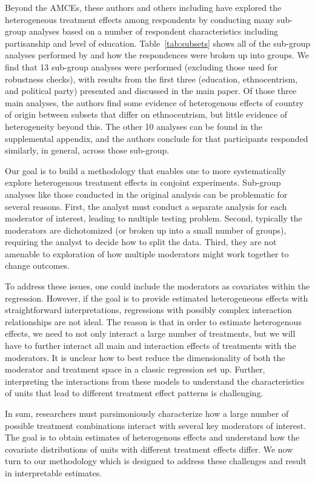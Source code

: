 Beyond the AMCEs, these authors and others including
\citet{newman2019economic} have explored the heterogeneous treatment
effects among respondents by conducting many sub-group analyses based
on a number of respondent characteristics including partisanship and
level of education.  Table~\ref{tab:subsets} shows all of the
sub-group analyses performed by \cite{hainmueller2015hidden} and how
the respondences were broken up into groups.  We find that 13
sub-group analyses were performed (excluding those used for robustness
checks), with results from the first three (education, ethnocentrism,
and political party) presented and discussed in the main paper.  Of
those three main analyses, the authors find some evidence of
heterogenous effects of country of origin between subsets that differ
on ethnocentrism, but little evidence of heterogeneity beyond this.
The other 10 analyses can be found in the supplemental appendix, and
the authors conclude for that participants responded similarly, in
general, across those sub-group.

Our goal is to build a methodology that enables one to more
systematically explore heterogenous treatment effects in conjoint
experiments.  Sub-group analyses like those conducted in the original
analysis can be problematic for several reasons.  First, the analyst
must conduct a separate analysis for each moderator of interest,
leading to multiple testing problem.  Second, typically the moderators
are dichotomized (or broken up into a small number of groups),
requiring the analyst to decide how to split the data.  Third, they are
not amenable to exploration of how multiple moderators might work
together to change outcomes.

To address these issues, one could include the moderators as
covariates within the regression.  However, if the goal is to provide
estimated heterogeneous effects with straightforward interpretations,
regressions with possibly complex interaction relationships are not
ideal.  The reason is that in order to estimate heterogenous effects,
we need to not only interact a large number of treatments, but we will
have to further interact all main and interaction effects of
treatments with the moderators.  It is unclear how to best reduce the
dimensionality of both the moderator and treatment space in a classic
regression set up.  Further, interpreting the interactions from these
models to understand the characteristics of units that lead to
different treatment effect patterns is challenging.

In sum, researchers must parsimoniously characterize how a large
number of possible treatment combinations interact with several key
moderators of interest.  The goal is to obtain estimates of
heterogenous effects and understand how the covariate distributions of
units with different treatment effects differ.  We now turn to our
methodology which is designed to address these challenges and result
in interpretable estimates.

